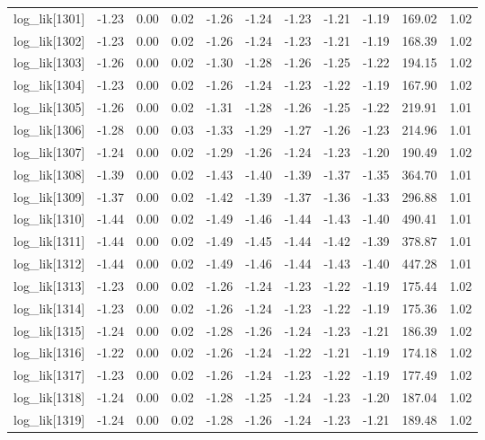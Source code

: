 \begin{table}[ht]
\begin{tabular}{rrrrrrrrrrr}
  log\_lik[1301] & -1.23 & 0.00 & 0.02 & -1.26 & -1.24 & -1.23 & -1.21 & -1.19 & 169.02 & 1.02 \\ 
  log\_lik[1302] & -1.23 & 0.00 & 0.02 & -1.26 & -1.24 & -1.23 & -1.21 & -1.19 & 168.39 & 1.02 \\ 
  log\_lik[1303] & -1.26 & 0.00 & 0.02 & -1.30 & -1.28 & -1.26 & -1.25 & -1.22 & 194.15 & 1.02 \\ 
  log\_lik[1304] & -1.23 & 0.00 & 0.02 & -1.26 & -1.24 & -1.23 & -1.22 & -1.19 & 167.90 & 1.02 \\ 
  log\_lik[1305] & -1.26 & 0.00 & 0.02 & -1.31 & -1.28 & -1.26 & -1.25 & -1.22 & 219.91 & 1.01 \\ 
  log\_lik[1306] & -1.28 & 0.00 & 0.03 & -1.33 & -1.29 & -1.27 & -1.26 & -1.23 & 214.96 & 1.01 \\ 
  log\_lik[1307] & -1.24 & 0.00 & 0.02 & -1.29 & -1.26 & -1.24 & -1.23 & -1.20 & 190.49 & 1.02 \\ 
  log\_lik[1308] & -1.39 & 0.00 & 0.02 & -1.43 & -1.40 & -1.39 & -1.37 & -1.35 & 364.70 & 1.01 \\ 
  log\_lik[1309] & -1.37 & 0.00 & 0.02 & -1.42 & -1.39 & -1.37 & -1.36 & -1.33 & 296.88 & 1.01 \\ 
  log\_lik[1310] & -1.44 & 0.00 & 0.02 & -1.49 & -1.46 & -1.44 & -1.43 & -1.40 & 490.41 & 1.01 \\ 
  log\_lik[1311] & -1.44 & 0.00 & 0.02 & -1.49 & -1.45 & -1.44 & -1.42 & -1.39 & 378.87 & 1.01 \\ 
  log\_lik[1312] & -1.44 & 0.00 & 0.02 & -1.49 & -1.46 & -1.44 & -1.43 & -1.40 & 447.28 & 1.01 \\ 
  log\_lik[1313] & -1.23 & 0.00 & 0.02 & -1.26 & -1.24 & -1.23 & -1.22 & -1.19 & 175.44 & 1.02 \\ 
  log\_lik[1314] & -1.23 & 0.00 & 0.02 & -1.26 & -1.24 & -1.23 & -1.22 & -1.19 & 175.36 & 1.02 \\ 
  log\_lik[1315] & -1.24 & 0.00 & 0.02 & -1.28 & -1.26 & -1.24 & -1.23 & -1.21 & 186.39 & 1.02 \\ 
  log\_lik[1316] & -1.22 & 0.00 & 0.02 & -1.26 & -1.24 & -1.22 & -1.21 & -1.19 & 174.18 & 1.02 \\ 
  log\_lik[1317] & -1.23 & 0.00 & 0.02 & -1.26 & -1.24 & -1.23 & -1.22 & -1.19 & 177.49 & 1.02 \\ 
  log\_lik[1318] & -1.24 & 0.00 & 0.02 & -1.28 & -1.25 & -1.24 & -1.23 & -1.20 & 187.04 & 1.02 \\ 
  log\_lik[1319] & -1.24 & 0.00 & 0.02 & -1.28 & -1.26 & -1.24 & -1.23 & -1.21 & 189.48 & 1.02 \\ 

\end{tabular}
\end{table}
